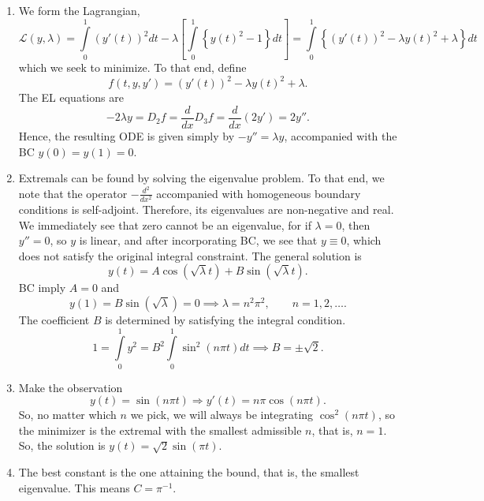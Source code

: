 \documentclass[letterpaper,twoside,11pt]{article}
\theoremstyle{mystyle}
\newcommand{\cblu}{\color{blue}}
\begin{document}
\cblu 


\begin{enumerate}
  \item We form the Lagrangian, 
  \[\mathcal{L}\left( {y,\lambda } \right) = \int\limits_0^1 {{{\left( {y'\left( t \right)} \right)}^2}dt}  - \lambda \left[ {\int\limits_0^1 {\left\{ {y{{\left( t \right)}^2} - 1} \right\}dt} } \right] = \int\limits_0^1 {\left\{ {{{\left( {y'\left( t \right)} \right)}^2} - \lambda y{{\left( t \right)}^2} + \lambda } \right\}dt} \]
  which we seek to minimize. To that end, define 
  \[f(t, y, y') = {{{\left( {y'\left( t \right)} \right)}^2} - \lambda y{{\left( t \right)}^2} + \lambda }.\]
  The EL equations are
  \[ - 2\lambda y = {D_2}f = \frac{d}{{dx}}{D_3}f = \frac{d}{{dx}}\left( {2y'} \right) = 2y''.\]
  Hence, the resulting ODE is given simply by $-y'' = \lambda y$, accompanied with the BC $y(0) = y(1) = 0$. 
  \item Extremals can be found by solving the eigenvalue problem. To that end, we note that the operator $-\frac{d^2}{dx^2}$ accompanied with homogeneous boundary conditions is self-adjoint. Therefore, its eigenvalues are non-negative and real. We immediately see that zero cannot be an eigenvalue, for if $\lambda = 0$, then $y'' = 0$, so $y$ is linear, and after incorporating BC, we see that $y \equiv 0$, which does not satisfy the original integral constraint. The general solution is  
  \[y\left( t \right) = A\cos \left( {\sqrt \lambda  t} \right) + B\sin \left( {\sqrt \lambda  t} \right).\]
  BC imply $A = 0$ and 
  \[y\left( 1 \right) = B\sin \left( {\sqrt \lambda  } \right) = 0 \implies \lambda  = {n^2}{\pi ^2},\qquad n =1, 2, \dots .\]
  The coefficient $B$ is determined by satisfying the integral condition.
  \[1 = \int\limits_0^1 {{y^2}}  = {B^2}\int\limits_0^1 {{{\sin }^2}\left( {n\pi t} \right)dt}  \implies  B =  \pm \sqrt 2 .\]
  \item Make the observation 
  \[y\left( t \right) = \sin \left( {n\pi t} \right) \Rightarrow y'\left( t \right) = n\pi \cos \left( {n\pi t} \right).\]
  So, no matter which $n$ we pick, we will always be integrating $\cos^2(n\pi t)$, so the minimizer is the extremal with the smallest admissible $n$, that is, $n = 1$. So, the solution is $y(t) = \sqrt{2} \sin(\pi t)$. 
  \item The best constant is the one attaining the bound, that is, the smallest eigenvalue. This means $C = \pi^{-1}$. 
\end{enumerate}
\end{document}
